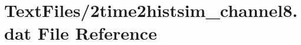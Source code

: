 \hypertarget{2time2histsim__channel8_8dat}{}\section{Text\+Files/2time2histsim\+\_\+channel8.dat File Reference}
\label{2time2histsim__channel8_8dat}
